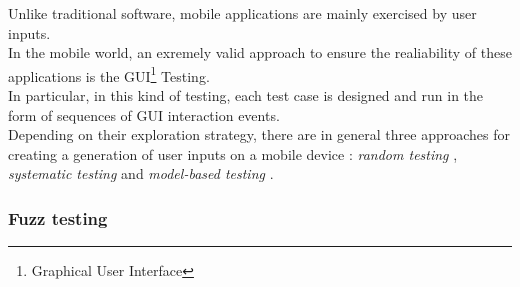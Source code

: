 Unlike traditional software, mobile applications are mainly exercised by user inputs. \\ 
In the mobile world, an exremely valid approach to ensure the realiability of these applications is the GUI\footnote{Graphical User Interface} Testing. \\ 
In particular, in this kind of testing, each test case is designed and run in the form of sequences of GUI interaction events.  \\
Depending on their exploration strategy, there are in general three approaches for creating a generation of user inputs on a mobile device \cite{dynodroid, areWeThereYet}: \textit{random testing} \cite{dynodroid, monkey}, \textit{systematic testing} \cite{evodroid} and \textit{model-based testing} \cite{mobiguitar, guidedgui, mining}. 
\subsubsection{Fuzz testing}

